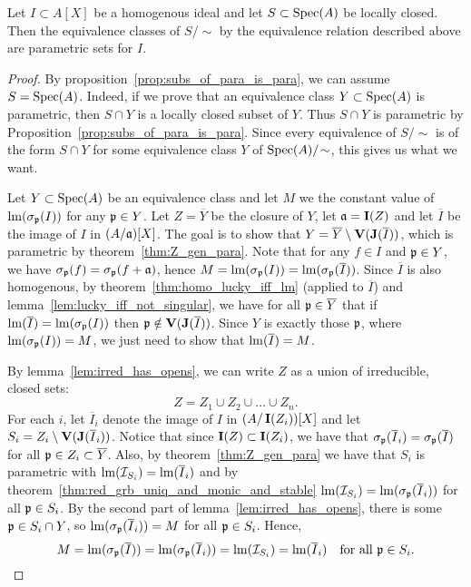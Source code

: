\begin{theorem}\label{thm:proj_equiv_are_para}
  Let $I \subset A[X]$ be a homogenous ideal and let $S \subset \operatorname{Spec}(A)$ be locally closed. Then the equivalence classes of $S/\sim$ by the equivalence relation described above are parametric sets for $I$.
\end{theorem}
\begin{proof}
  By proposition~\ref{prop:subs_of_para_is_para}, we can assume $S = \operatorname{Spec}(A)$. Indeed, if we prove that an equivalence class $Y \subset \operatorname{Spec}(A)$ is parametric, then $S \cap Y$ is a locally closed subset of $Y$. Thus $S \cap Y$ is parametric by Proposition~\ref{prop:subs_of_para_is_para}. Since every equivalence of $S/\!\sim$ is of the form $S \cap Y$ for some equivalence class $Y$ of $\operatorname{Spec}(A)/\!\sim$, this gives us what we want.

  Let $Y \subset \operatorname{Spec}(A)$ be an equivalence class and let $M$ we the constant value of $\operatorname{lm}(\sigma_{\mathfrak p}(I))$ for any $\mathfrak p \in Y$. Let $Z = \overline Y$ be the closure of $Y$, let $\mathfrak{a} = \operatorname{\mathbf I}(Z)$ and let $\overline I$ be the image of $I$ in $(A/\mathfrak{a})[X]$. The goal is to show that $Y = \overline Y \setminus \operatorname{\mathbf V}(\operatorname{\mathbf J}(\overline I))$, which is parametric by theorem~\ref{thm:Z_gen_para}. Note that for any $f \in I$ and $\mathfrak p \in Y$, we have $\sigma_{\mathfrak p}(f) = \sigma_{\mathfrak p}(f + \mathfrak{a})$, hence $M = \operatorname{lm}(\sigma_{\mathfrak p}(I)) = \operatorname{lm}(\sigma_{\mathfrak p}(\overline I))$. Since $\overline I$ is also homogenous, by theorem~\ref{thm:homo_lucky_iff_lm} (applied to $\overline I$) and lemma~\ref{lem:lucky_iff_not_singular}, we have for all $\mathfrak p \in \overline Y$ that if $\operatorname{lm}(\overline I) = \operatorname{lm}(\sigma_{\mathfrak p}(I))$ then $\mathfrak p \notin \operatorname{\mathbf V}(\operatorname{\mathbf J}(\overline I))$. Since $Y$ is exactly those $\mathfrak p$, where $\operatorname{lm}(\sigma_{\mathfrak p}(I)) = M$, we just need to show that $\operatorname{lm}(\overline I) = M$.

  By lemma~\ref{lem:irred_has_opens}, we can write $Z$ as a union of irreducible, closed sets: \[Z = Z_{1} \cup Z_{2} \cup \dots \cup Z_{n}.\]
  For each $i$, let $\overline I_{i}$ denote the image of $I$ in $(A/\operatorname{\mathbf I}(Z_{i}))[X]$ and let $S_{i} = Z_{i} \setminus \operatorname{\mathbf V}(\operatorname{\mathbf J}(\overline I_{i}))$. Notice that since $\operatorname{\mathbf I}(Z) \subset \operatorname{\mathbf I}(Z_{i})$, we have that $\sigma_{\mathfrak p}(\overline I_{i}) = \sigma_{\mathfrak p}(\overline I)$ for all $\mathfrak p \in Z_{i} \subset \overline Y$. Also, by theorem~\ref{thm:Z_gen_para} we have that $S_{i}$ is parametric with $\operatorname{lm}(\mathcal I_{S_{i}}) = \operatorname{lm}(\overline I_{i})$ and by theorem~\ref{thm:red_grb_uniq_and_monic_and_stable} $\operatorname{lm}(\mathcal I_{S_{i}}) = \operatorname{lm}(\sigma_{\mathfrak p}(\overline I_{i}))$ for all $\mathfrak p \in S_{i}$. By the second part of lemma~\ref{lem:irred_has_opens}, there is some $\mathfrak p \in S_{i} \cap Y$, so $\operatorname{lm}(\sigma_{\mathfrak p}(\overline I_{i})) = M$ for all $\mathfrak p \in S_{i}$. Hence,
  \[M = \operatorname{lm}(\sigma_{\mathfrak p}(\overline I)) = \operatorname{lm}(\sigma_{\mathfrak p}(\overline I_{i})) = \operatorname{lm}(\mathcal I_{S_{i}}) = \operatorname{lm}(\overline I_{i}) \quad \text{for all $\mathfrak p \in S_{i}$}.\]


\end{proof}
